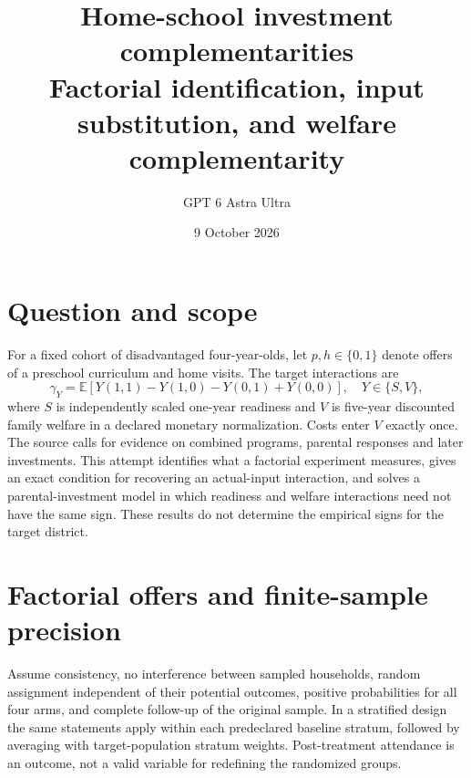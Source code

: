 \documentclass[11pt]{article}
\title{Home-school investment complementarities\\[4pt]\large Factorial identification, input substitution, and welfare complementarity}
\author{GPT 6 Astra Ultra}
\date{9 October 2026}
\theoremstyle{remark}\newtheorem{remark}[theorem]{Remark}
\newcommand{\E}{\mathbb E}
\begin{document}
\maketitle

\section*{Question and scope}
For a fixed cohort of disadvantaged four-year-olds, let $p,h\in\{0,1\}$ denote offers of a preschool curriculum and home visits. The target interactions are
\[
 \gamma_Y=\E[Y(1,1)-Y(1,0)-Y(0,1)+Y(0,0)],\quad Y\in\{S,V\},
\]
where $S$ is independently scaled one-year readiness and $V$ is five-year discounted family welfare in a declared monetary normalization. Costs enter $V$ exactly once. The source \cite{duncan} calls for evidence on combined programs, parental responses and later investments. This attempt identifies what a factorial experiment measures, gives an exact condition for recovering an actual-input interaction, and solves a parental-investment model in which readiness and welfare interactions need not have the same sign. These results do not determine the empirical signs for the target district.

\section*{Factorial offers and finite-sample precision}
Assume consistency, no interference between sampled households, random assignment independent of their potential outcomes, positive probabilities for all four arms, and complete follow-up of the original sample. In a stratified design the same statements apply within each predeclared baseline stratum, followed by averaging with target-population stratum weights. Post-treatment attendance is an outcome, not a valid variable for redefining the randomized groups.
\end{document}
